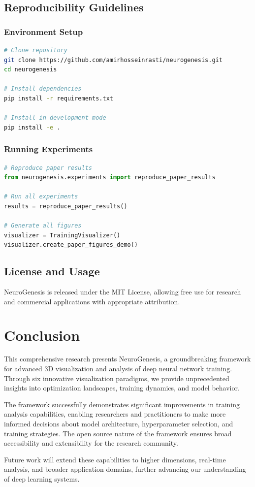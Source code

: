 \documentclass[12pt,a4paper]{article}
\begin{document}
\subsection{Reproducibility Guidelines}

\subsubsection{Environment Setup}

\begin{lstlisting}[language=bash]
# Clone repository
git clone https://github.com/amirhosseinrasti/neurogenesis.git
cd neurogenesis

# Install dependencies
pip install -r requirements.txt

# Install in development mode
pip install -e .
\end{lstlisting}

\subsubsection{Running Experiments}

\begin{lstlisting}[language=python]
# Reproduce paper results
from neurogenesis.experiments import reproduce_paper_results

# Run all experiments
results = reproduce_paper_results()

# Generate all figures
visualizer = TrainingVisualizer()
visualizer.create_paper_figures_demo()
\end{lstlisting}

\subsection{License and Usage}

NeuroGenesis is released under the MIT License, allowing free use for research and commercial applications with appropriate attribution.

\section{Conclusion}

This comprehensive research presents NeuroGenesis, a groundbreaking framework for advanced 3D visualization and analysis of deep neural network training. Through six innovative visualization paradigms, we provide unprecedented insights into optimization landscapes, training dynamics, and model behavior.

The framework successfully demonstrates significant improvements in training analysis capabilities, enabling researchers and practitioners to make more informed decisions about model architecture, hyperparameter selection, and training strategies. The open source nature of the framework ensures broad accessibility and extensibility for the research community.

Future work will extend these capabilities to higher dimensions, real-time analysis, and broader application domains, further advancing our understanding of deep learning systems.
\end{document}

